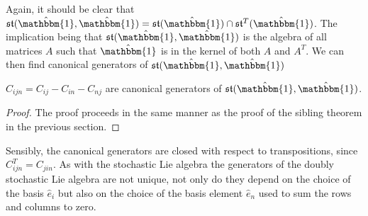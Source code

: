 Again, it should be clear that $\mathfrak{st}(\hat{\mathbbm{1}}, \hat{\mathbbm{1}}) = \mathfrak{st}(\hat{\mathbbm{1}}) \cap \mathfrak{st}^T(\hat{\mathbbm{1}})$.
The implication being that $\mathfrak{st}(\hat{\mathbbm{1}}, \hat{\mathbbm{1}})$
is the algebra of all matrices $A$ such that $\hat{\mathbbm{1}}$ is in the 
kernel of both $A$ and $A^T$. We can then find canonical generators of $\mathfrak{st}(\hat{\mathbbm{1}}, \hat{\mathbbm{1}})$


\begin{theorem}
	$C_{ijn} = C_{ij} - C_{in} - C_{nj}$ are canonical generators of $\mathfrak{st}(\hat{\mathbbm{1}}, \hat{\mathbbm{1}})$.
\end{theorem}

\begin{proof}
	The proof proceeds in the same manner as the proof of the sibling theorem in
	the previous section.
\end{proof}

Sensibly, the canonical generators are closed with respect to transpositions, 
since $C_{ijn}^T = C_{jin}$. As with the stochastic Lie algebra the generators 
of the doubly stochastic Lie algebra are not unique, not only do they depend on 
the choice of the basis $\hat{e}_i$ but also on the choice of the basis element 
$\hat{e}_n$ used to sum the rows and columns to zero.

